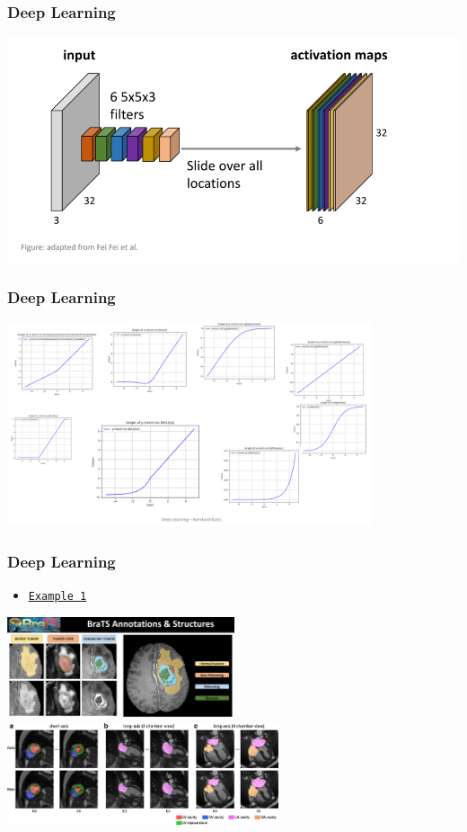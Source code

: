 \begin{frame}
    \frametitle{Deep Learning}
    \includegraphics{img/convolution.png}
\end{frame}

\begin{frame}
    \frametitle{Deep Learning}
    \includegraphics[height=6cm]{img/activation.png}
\end{frame}


\begin{frame}
    \frametitle{Deep Learning}
    \begin{itemize}
        \item \href{https://www.youtube.com/watch?v=81AvQQnpG4Q}{\texttt{Example 1}}
        \end{itemize}
        \begin{center}
    \includegraphics[height=3cm]{img/brats-tumor-subregions.jpg}
    \includegraphics[height=3cm]{img/cardiac.png}
     \end{center}
\end{frame}


